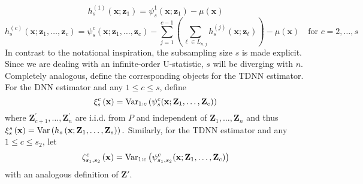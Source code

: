 \begin{equation}
	h_{s}^{(1)}\left(\mathbf{x}; \mathbf{z}_{1}\right)
	= \psi_{s}^{1}(\mathbf{x}; \mathbf{z}_{1}) - \mu(\mathbf{x})
\end{equation}
\begin{equation}
	h_{s}^{(c)}\left(\mathbf{x}; \mathbf{z}_{1}, \dotsc, \mathbf{z}_{c}\right)
	= \psi_{s}^{c}(\mathbf{x}; \mathbf{z}_{1}, \dotsc, \mathbf{z}_{c}) - \sum_{j = 1}^{c-1}\left(\sum_{\ell \in L_{n,j}}h_{s}^{(j)}(\mathbf{x}; \mathbf{z}_{\ell})\right) - \mu(\mathbf{x})
	\quad \text{for } c = 2, \dotsc, s
\end{equation}
In contrast to the notational inspiration, the subsampling size $s$ is made explicit.
Since we are dealing with an infinite-order U-statistic, $s$ will be diverging with $n$.
Completely analogous, define the corresponding objects for the TDNN estimator.
For the DNN estimator and any $1 \leq c \leq s$, define
\begin{equation}\label{eq:xi_s_c}
	\xi_{s}^{c}\left(\mathbf{x}\right)
	= \text{Var}_{1:c}\left(\psi_{s}^{c}(\mathbf{x}; \mathbf{Z}_{1}, \dotsc, \mathbf{Z}_{c})\right)
\end{equation}
where $\mathbf{Z}_{c+1}^{\prime}, \ldots, \mathbf{Z}_n^{\prime}$ are i.i.d. from $P$ and independent of $\mathbf{Z}_1, \ldots, \mathbf{Z}_n$ and thus
$\xi_{s}^{s}\left(\mathbf{x}\right) = \text{Var}\left(h_s\left(\mathbf{x}; \mathbf{Z}_1, \ldots, \mathbf{Z}_s\right)\right).$
Similarly, for the TDNN estimator and any $1 \leq c \leq s_2$, let
\begin{equation}\label{eq:zeta_s1s2_c}
	\zeta_{s_1, s_2}^{c}\left(\mathbf{x}\right)
	= \text{Var}_{1:c}\left(\psi_{s_1, s_2}^{c}(\mathbf{x}; \mathbf{Z}_{1}, \dotsc, \mathbf{Z}_{c})\right)
\end{equation}
with an analogous definition of $\mathbf{Z}'$.

